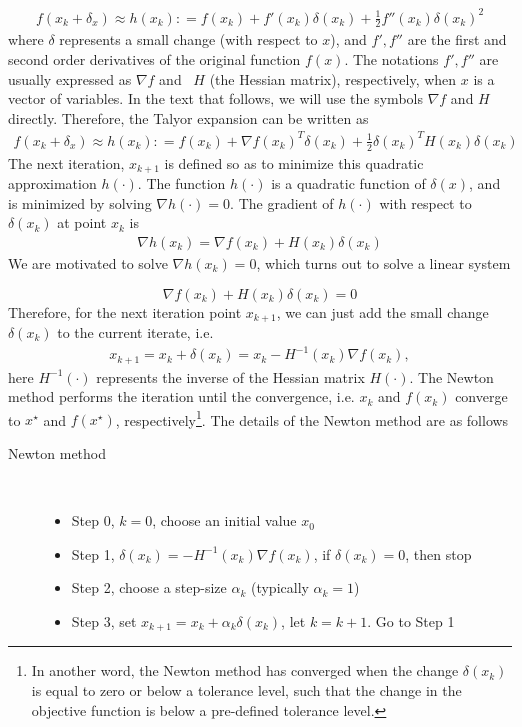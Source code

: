 \documentclass  [
  paper    = a4,
  BCOR     = 10mm,
  twoside,
  fontsize = 12pt,
  fleqn,
  toc      = bibnumbered,
  toc      = listofnumbered,
  numbers  = noendperiod,
  headings = normal,
  listof   = leveldown,
  version  = 3.03
]                                       {scrreprt}
\newcommand{\<}{\langle}
\renewcommand{\>}{\rangle}
\begin{document}
\begin{align*}
	f(x_k + \delta_x) \approx h(x_k) : = f(x_k) + f'(x_k)\delta(x_k) +\frac{1}{2}f''(x_k)\delta(x_k)^2 
\end{align*}
where $\delta$ represents a small change (with respect to $x$), and $f', f''$ are the first and second order derivatives of the original function $f(x)$. The notations $f', f''$ are usually expressed as $\nabla f$ and  $H$ (the Hessian matrix), respectively, when $x$ is a vector of variables. In the text that follows, we will use the symbols $\nabla f$ and $H$ directly. Therefore, the Talyor expansion can be written as 
\begin{align*}
	f(x_k + \delta_x) \approx h(x_k) : = f(x_k) + \nabla f(x_k)^T\delta(x_k) +\frac{1}{2}\delta(x_k) ^TH(x_k)\delta(x_k) 
\end{align*}
The next iteration, $x_{k+1}$ is defined so as to minimize this quadratic approximation $h(\cdot)$. The function $h(\cdot)$ is a quadratic function of $\delta(x)$, and is minimized by solving $\nabla h(\cdot) = 0$. The gradient of $h(\cdot)$ with respect to $\delta(x_k)$ at point $x_k$ is
\begin{align*}
	\nabla h(x_k) = \nabla f(x_k) + H(x_k) \delta(x_k) 
\end{align*}
We are motivated to solve $\nabla h(x_k) =0$, which turns out to solve a linear system

\begin{equation}
	\nabla f(x_k) + H(x_k) \delta(x_k) =0
	\label{HessianEq}
\end{equation}
Therefore, for the next iteration point $x_{k+1}$, we can just add the small change $\delta(x_k)$ to the current iterate, i.e. 
\begin{align*}
	x_{k+1}  = x_k + \delta(x_k) = x_k - H^{-1}(x_k)\nabla f(x_k), 
\end{align*}
here $ H^{-1}(\cdot)$ represents the inverse of the Hessian matrix $H(\cdot)$. The Newton method performs the iteration until the convergence, i.e. $x_k$ and $f(x_k)$ converge to $x^\star$ and $f(x^\star)$, respectively\footnote{In another word, the Newton method has converged when the change $\delta(x_k)$ is equal to zero or below a tolerance level, such that the change in the objective function is below a pre-defined tolerance level.}. The details of the Newton method are as follows
\begin{description}
	\item[Newton method]\ 
	\begin{itemize}
		\item Step 0, $k=0$, choose an initial value $x_0$ 
		\item Step 1, $\delta(x_k)  =- H^{-1}(x_k)\nabla f(x_k)$, if $\delta(x_k) =0$, then stop
		\item Step 2, choose a step-size $\alpha_k$ (typically $\alpha_k =1$)
		\item Step 3, set $x_{k+1}  = x_k + \alpha_k \delta(x_k) $, let $k= k+1$. Go to Step 1
	\end{itemize}
\end{description}
\end{document}
